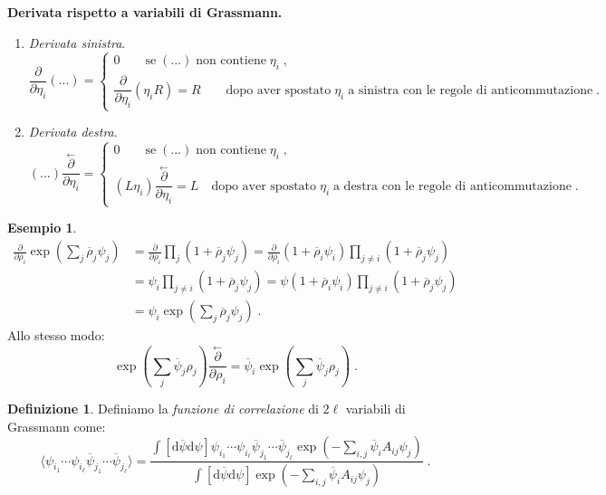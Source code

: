 \documentclass[12pt,a4paper]{article}
\theoremstyle{definition}
\newtheorem{dfn}{Definizione}[section]
\newtheorem{exm}{Esempio}
\newcommand{\diff}[1][]{\mathrm{d}#1}
\newcommand{\bra}{\langle}
\newcommand{\ket}{\rangle}
\numberwithin{equation}{section}
\begin{document}
\textbf{Derivata rispetto a variabili di Grassmann.} \\
\begin{enumerate}
\item \emph{Derivata sinistra}.
\begin{equation}
\frac{\partial}{\partial \eta_i}(...)=
\begin{cases}
0\qquad \mbox{se}\; (...)\;\mbox{non contiene}\; \eta_i\;, \\
\dfrac{\partial}{\partial\eta_i}(\eta_iR)=R\qquad \mbox{dopo aver spostato}\; \eta_i\;\mbox{a sinistra con le regole di anticommutazione}\;.
\end{cases}
\end{equation}
\item \emph{Derivata destra}.
\begin{equation}
(...)\frac{\stackrel{\leftarrow}{\partial}}{\partial\eta_i}=\begin{cases}
0\qquad\mbox{se}\; (...)\;\mbox{non contiene}\;\eta_i\;, \\
(L\eta_i)\dfrac{\stackrel{\leftarrow}{\partial}}{\partial\eta_i}=L\quad\mbox{dopo aver spostato}\; \eta_i\;\mbox{a destra con le regole di anticommutazione}\;.
\end{cases}
\end{equation}
\end{enumerate}
\begin{exm}
\begin{align*}
\frac{\partial}{\partial\overline{\rho}_i}\exp\left(\sum_j\overline{\rho}_j\psi_j\right)&=
\frac{\partial}{\partial\overline{\rho}_i}\prod_j(1+\overline{\rho}_j\psi_j)=
\frac{\partial}{\partial\overline{\rho}_i}(1+\overline{\rho}_i\psi_i)\prod_{j\ne i}(1+\overline{\rho}_j\psi_j) \\
&=\psi_i\prod_{j\ne i}(1+\overline{\rho}_j\psi_j)=\psi(1+\overline{\rho}_i\psi_i)\prod_{j\ne i}(1+\overline{\rho}_j\psi_j) \\
&=\psi_i\exp\left(\sum_j\overline{\rho}_j\psi_j\right)\;.
\end{align*}
Allo stesso modo:
$$
\exp\left(\sum_j\overline{\psi}_j\rho_j\right)\frac{\stackrel{\leftarrow}{\partial}}{\partial\rho_i}=\overline{\psi}_i\exp\left(\sum_j\overline{\psi}_j\rho_j\right)\;.
$$
\end{exm}
\begin{dfn}
Definiamo la \emph{funzione di correlazione} di $2\ell$ variabili di Grassmann come:
\begin{equation}
\bra \psi_{i_1}\cdots\psi_{i_{\ell}}\overline{\psi}_{j_1}\cdots\overline{\psi}_{j_{\ell}}\ket =
\frac{\int[\diff{\overline{\psi}}\diff{\psi}]\psi_{i_1}\cdots\psi_{i_{\ell}}\overline{\psi}_{j_1}\cdots\overline{\psi}_{j_{\ell}}\exp\left(-\sum_{i,j}\overline{\psi}_iA_{ij}\psi_j\right)}{\int[\diff{\overline{\psi}}\diff{\psi}]\exp\left(-\sum_{i,j}\overline{\psi}_iA_{ij}\psi_j\right)}\;.
\end{equation}
\end{dfn}
\end{document}

